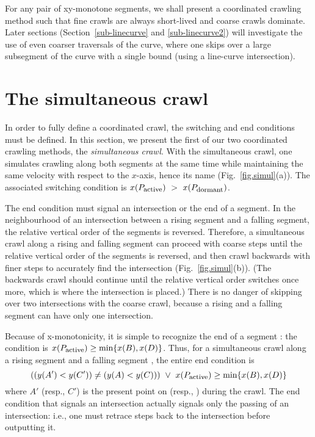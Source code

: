 For any pair of xy-monotone segments, we shall present a coordinated crawling method such 
that fine crawls are always short-lived and coarse crawls dominate.
Later sections (Section~\ref{sub-linecurve} and \ref{sub-linecurve2}) will investigate the use 
of even coarser traversals of the curve, where one skips over a large subsegment of the curve 
with a single bound (using a line-curve intersection).

\section{The simultaneous crawl}
\label{sec-simul}

In order to fully define a coordinated crawl, the switching and end conditions must be defined.
In this section, we present the first of our two coordinated crawling methods, the 
{\em simultaneous crawl}.
With the simultaneous crawl, one simulates crawling along both 
segments at the same time while maintaining the same velocity with respect to the $x$-axis,
hence its name (Fig.~\ref{fig.simul}(a)).
The associated switching condition is 
$ x(P_{\mbox{\footnotesize{active}}})\ >\ x(P_{\mbox{\footnotesize{dormant}}}) $.


The end condition must signal an intersection or the end of a segment.
In the neighbourhood of an intersection between a rising segment and a falling segment, 
the relative vertical order of the segments is reversed.
Therefore, a simultaneous crawl along a rising and falling segment can proceed with coarse steps 
until the relative vertical order of the segments is reversed, and then crawl backwards
with finer steps to accurately find the intersection 
(Fig.~\ref{fig.simul}(b)).
(The backwards
	crawl should continue until the relative vertical order switches once more, which 
	is where the intersection is placed.)
There is no danger of skipping over two intersections with the coarse crawl, because
a rising and a falling segment can have only one intersection.

Because of x-monotonicity, it is simple to recognize the end of a segment : 
the condition is $x(P_{\mbox{\footnotesize{active}}}) \geq \mbox{min} \{x(B),x(D)\}$.
Thus, for a simultaneous crawl along a rising segment  and a falling segment ,
the entire end condition is 
\[ ((y(A') < y(C')) \neq (y(A) < y(C))) \ \vee \ 
x(P_{\mbox{\footnotesize{active}}}) \geq \mbox{min} \{x(B),x(D)\} \]
where $A'$ (resp., $C'$) is the present point on \arc{AB} (resp., ) during the crawl.
The end condition that signals an intersection actually signals only the passing of an 
intersection: i.e., one must retrace steps back to the intersection before outputting it.

